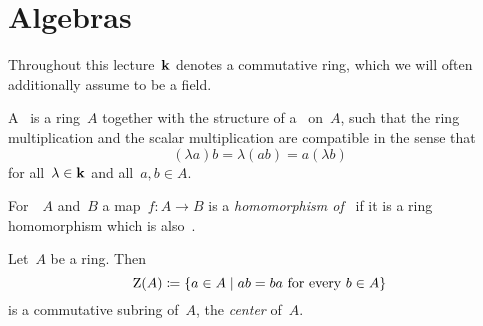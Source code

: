 \section{Algebras}


\begin{conventionnonum}
  Throughout this lecture~$\kf$ denotes a commutative ring, which we will often additionally assume to be a field.
\end{conventionnonum}


\begin{definition}
  A~\emph{{\kalg}} is a ring~$A$ together with the structure of a~{\module{$\kf$}} on~$A$, such that the ring multiplication and the scalar multiplication are compatible in the sense that
  \begin{equation}
    \label{compatibility of multiplications}
      (\lambda a) b
    = \lambda (ab)
    = a (\lambda b)
  \end{equation}
  for all~$\lambda \in \mathbf{k}$ and all~$a, b \in A$.
\end{definition}


\begin{definition}
  For~{\kalgs}~$A$ and~$B$ a map~$f \colon A \to B$ is a \emph{homomorphism of~{\kalgs}} if it is a ring homomorphism which is also~{\klin}.
\end{definition}


\begin{remark}
  Let~$A$ be a ring.
  Then
  \[
              \ringcenter(A)
    \defined  \{
                a \in A
              \suchthat
                \text{$ab = ba$ for every~$b \in A$}
              \}
  \]
  is a commutative subring of~$A$, the \emph{center} of~$A$.
\end{remark}


